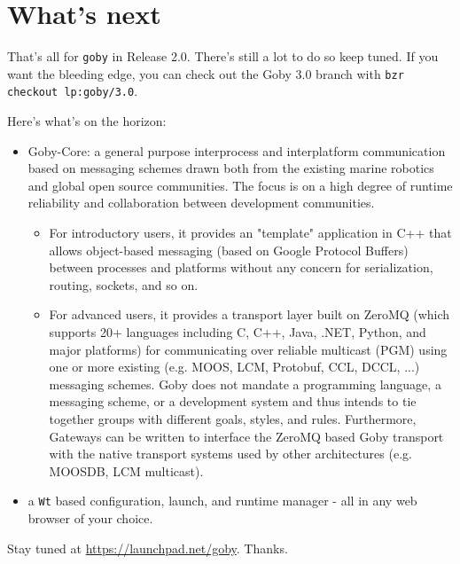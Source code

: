 \chapter{What's next}

That's all for \verb|goby| in Release 2.0. There's still a lot to do so keep tuned. If you want the bleeding edge, you can check out the Goby 3.0 branch with 
\verb|bzr checkout lp:goby/3.0|.

Here's what's on the horizon:
\begin{itemize}
\item Goby-Core: a general purpose interprocess and interplatform communication based on messaging schemes drawn both from the existing marine robotics and global open source communities. The focus is on a high degree of runtime reliability and collaboration between development communities.
\begin{itemize}
\item For introductory users, it provides an "template" application in C++ that allows object-based messaging (based on Google Protocol Buffers) between processes and platforms without any concern for serialization, routing, sockets, and so on.
\item For advanced users, it provides a transport layer built on ZeroMQ (which supports 20+ languages including C, C++, Java, .NET, Python, and major platforms) for communicating over reliable multicast (PGM) using one or more existing (e.g. MOOS, LCM, Protobuf, CCL, DCCL, ...) messaging schemes. Goby does not mandate a programming language, a messaging scheme, or a development system and thus intends to tie together groups with different goals, styles, and rules. Furthermore, Gateways can be written to interface the ZeroMQ based Goby transport with the native transport systems used by other architectures (e.g. MOOSDB, LCM multicast).
\end{itemize}
\item a \verb|Wt| \cite{wt} based configuration, launch, and runtime manager - all in any web browser of your choice.
\end{itemize}

Stay tuned at \url{https://launchpad.net/goby}. Thanks.
